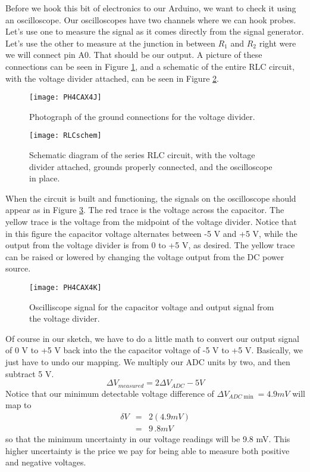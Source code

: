 Before we hook this bit of electronics to our Arduino, we want to check it
using an oscilloscope.
Our oscilloscopes have two channels where we can hook probes. Let's use one
to measure the signal as it comes directly from the signal generator. Let's
use the other to measure at the junction in between $R_{1}$ and $R_{2}$
right were we will connect pin A0. That should be our output. A picture of 
these connections can be seen in Figure \ref{fig:rlc_ground}, and a 
schematic of the entire RLC circuit, with the voltage divider attached,
can be seen in Figure \ref{fig:rlc_schematic}.

\begin{figure}[htbp!]
	\centering
	\texttt{[image: PH4CAX4J]}
	\caption{Photograph of the ground connections for the voltage 
	divider.}
	\label{fig:rlc_ground}
\end{figure}
\begin{figure}[htbp!]
	\centering
	\texttt{[image: RLCschem]}
	\caption[Schematic diagram of the series RLC circuit, with the
	voltage divider attached]{Schematic diagram of the series 
	RLC circuit, with the 
	voltage divider attached, grounds properly connected, and the
	oscilloscope in place.}
	\label{fig:rlc_schematic}
\end{figure}

When the circuit is built and functioning, the signals on the oscilloscope
should appear as in Figure \ref{fig:rlc_osc}.
The red trace is the voltage across the capacitor.
The yellow trace is the voltage from the midpoint of the voltage divider. 
Notice that in this figure the capacitor voltage alternates between
-5 V and +5 V, while the output from the voltage divider is from 0 to +5 V,
as desired. The yellow trace can be raised or lowered by changing the voltage
output from the DC power source.
\begin{figure}[htbp!]
	\centering
	\texttt{[image: PH4CAX4K]}
	\caption{Oscilliscope signal for the capacitor voltage and output
	signal from the voltage divider.}
	\label{fig:rlc_osc}
\end{figure}

Of course in our sketch, we have to do a little math to convert our 
output signal of 0 V to +5 V back into the the capacitor voltage of
-5 V to +5 V. Basically, we just have to undo our mapping. We multiply our
ADC units by two, and then subtract 5 V.
\begin{equation}
\Delta V_{measured}=2\Delta V_{ADC}-5\unit{V}
\end{equation}
Notice that our minimum detectable voltage difference of $\Delta V_{ADC\min
}=4.9\unit{mV}$ will map to 
\begin{eqnarray*}
\delta V &=&2\left( 4.9\unit{mV}\right) \\
&=&9\,.8\unit{mV}
\end{eqnarray*}
so that the minimum uncertainty in our voltage readings will be 9.8 mV.
This higher uncertainty is the price we pay for being able to measure both
positive and negative voltages.

